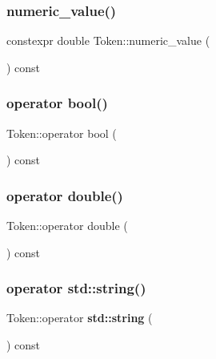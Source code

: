 \mbox{\label{class_token_aae9aebc462c07a05b14bf04de8416205}} 
\subsubsection{\texorpdfstring{numeric\+\_\+value()}{numeric\_value()}}
{\footnotesize\ttfamily constexpr double Token\+::numeric\+\_\+value (\begin{DoxyParamCaption}{ }\end{DoxyParamCaption}) const\hspace{0.3cm}{\ttfamily [inline]}}

\mbox{\label{class_token_a34140d60656a12bbfcdfbcf85e985133}} 
\subsubsection{\texorpdfstring{operator bool()}{operator bool()}}
{\footnotesize\ttfamily Token\+::operator bool (\begin{DoxyParamCaption}{ }\end{DoxyParamCaption}) const}

\mbox{\label{class_token_a9d9ecf295a7bb23922db6ea5b9e97833}} 
\subsubsection{\texorpdfstring{operator double()}{operator double()}}
{\footnotesize\ttfamily Token\+::operator double (\begin{DoxyParamCaption}{ }\end{DoxyParamCaption}) const}

\mbox{\label{class_token_a37a03ca940a3abaec1491c9306bafa2a}} 
\subsubsection{\texorpdfstring{operator std\+::string()}{operator std::string()}\hspace{0.1cm}{\footnotesize\ttfamily [1/2]}}
{\footnotesize\ttfamily Token\+::operator \textbf{ std\+::string} (\begin{DoxyParamCaption}{ }\end{DoxyParamCaption}) const}

